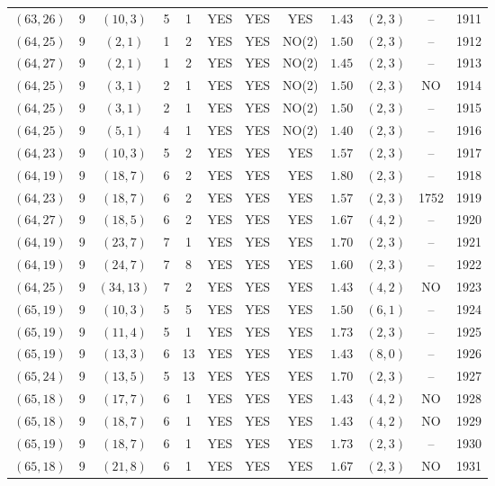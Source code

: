 \begin{longtable}{|c|c|c|c|c|c|c|c|c|c|c|c|}
$(63,26)$ & 9 & $(10,3)$ & 5 & 1 & YES & YES & YES & $1.43$ & $(2,3)$ & -- & 1911\\
$(64,25)$ & 9 & $(2,1)$ & 1 & 2 & YES & YES & NO(2) & $1.50$ & $(2,3)$ & -- & 1912\\
$(64,27)$ & 9 & $(2,1)$ & 1 & 2 & YES & YES & NO(2) & $1.45$ & $(2,3)$ & -- & 1913\\
$(64,25)$ & 9 & $(3,1)$ & 2 & 1 & YES & YES & NO(2) & $1.50$ & $(2,3)$ & NO & 1914\\
$(64,25)$ & 9 & $(3,1)$ & 2 & 1 & YES & YES & NO(2) & $1.50$ & $(2,3)$ & -- & 1915\\
$(64,25)$ & 9 & $(5,1)$ & 4 & 1 & YES & YES & NO(2) & $1.40$ & $(2,3)$ & -- & 1916\\
$(64,23)$ & 9 & $(10,3)$ & 5 & 2 & YES & YES & YES & $1.57$ & $(2,3)$ & -- & 1917\\
$(64,19)$ & 9 & $(18,7)$ & 6 & 2 & YES & YES & YES & $1.80$ & $(2,3)$ & -- & 1918\\
$(64,23)$ & 9 & $(18,7)$ & 6 & 2 & YES & YES & YES & $1.57$ & $(2,3)$ & 1752 & 1919\\
$(64,27)$ & 9 & $(18,5)$ & 6 & 2 & YES & YES & YES & $1.67$ & $(4,2)$ & -- & 1920\\
$(64,19)$ & 9 & $(23,7)$ & 7 & 1 & YES & YES & YES & $1.70$ & $(2,3)$ & -- & 1921\\
$(64,19)$ & 9 & $(24,7)$ & 7 & 8 & YES & YES & YES & $1.60$ & $(2,3)$ & -- & 1922\\
$(64,25)$ & 9 & $(34,13)$ & 7 & 2 & YES & YES & YES & $1.43$ & $(4,2)$ & NO & 1923\\
$(65,19)$ & 9 & $(10,3)$ & 5 & 5 & YES & YES & YES & $1.50$ & $(6,1)$ & -- & 1924\\
$(65,19)$ & 9 & $(11,4)$ & 5 & 1 & YES & YES & YES & $1.73$ & $(2,3)$ & -- & 1925\\
$(65,19)$ & 9 & $(13,3)$ & 6 & 13 & YES & YES & YES & $1.43$ & $(8,0)$ & -- & 1926\\
$(65,24)$ & 9 & $(13,5)$ & 5 & 13 & YES & YES & YES & $1.70$ & $(2,3)$ & -- & 1927\\
$(65,18)$ & 9 & $(17,7)$ & 6 & 1 & YES & YES & YES & $1.43$ & $(4,2)$ & NO & 1928\\
$(65,18)$ & 9 & $(18,7)$ & 6 & 1 & YES & YES & YES & $1.43$ & $(4,2)$ & NO & 1929\\
$(65,19)$ & 9 & $(18,7)$ & 6 & 1 & YES & YES & YES & $1.73$ & $(2,3)$ & -- & 1930\\
$(65,18)$ & 9 & $(21,8)$ & 6 & 1 & YES & YES & YES & $1.67$ & $(2,3)$ & NO & 1931\\

\end{longtable}
